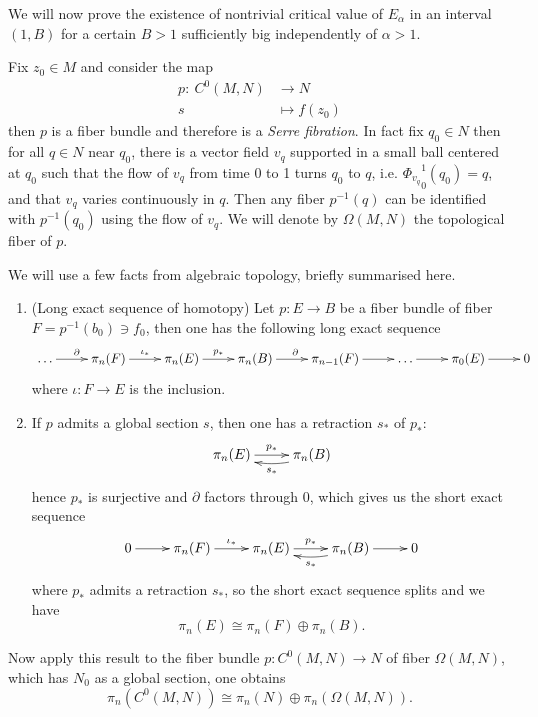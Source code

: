 We will now prove the existence of nontrivial critical value of \(E_\alpha\) in an
interval \((1, B)\) for a certain \(B>1\) sufficiently big independently of \(\alpha
> 1\).

Fix \(z_0\in M\) and consider the map 
\begin{align*}
  p: \ C^0(M,N) &\longrightarrow N\\
       s	&\longmapsto	 f(z_0)
\end{align*}
then \(p\) is a fiber bundle and therefore is a \emph{Serre fibration}. In fact fix \(q_0\in N\) then for all \(q\in N\) near \(q_0\), there is a vector field \(v_q\) supported
in a small ball centered at \(q_0\) such that the flow of \(v_q\) from time 0 to 1
turns \(q_0\) to \(q\), i.e. \({\Phi_{v_q}}_0^1(q_0)=q\), and that \(v_q\) varies continuously
in \(q\). Then any fiber \(p^{-1}(q)\) can be identified with \(p^{-1}(q_0)\) using
the flow of \(v_q\). We will denote by \(\Omega(M,N)\) the topological fiber of \(p\).


We will use a few facts from algebraic topology, briefly summarised here.

\begin{fact}
\label{fact:alg-top-Omega-M-N}
\begin{enumerate}
\item (Long exact sequence of homotopy) Let \(p: E \longrightarrow B\) be a fiber bundle
of fiber \(F = p^{-1}(b_0) \ni f_0\), then one has the following long exact sequence
\[
    \xymatrix{
    \dots \ar@{->}[r]^{\partial} & \pi_n(F) \ar@{->}[r]^{\iota_*} & \pi_n(E) \ar@{->}[r]^{p_*} & \pi_n(B) \ar@{->}[r]^{\partial} & \pi_{n-1}(F) \ar@{->}[r] & \dots \ar@{->}[r] & \pi_0(E) \ar@{->}[r] & 0
    }
   \]
 where \(\iota: F \longrightarrow E\) is the inclusion.
\item If \(p\) admits a global section \(s\), then one has a retraction \(s_*\) of \(p_*\):
\[
    \xymatrix{
    \pi_n(E) \ar@{->}[r]^{p_*} & \pi_n(B) \ar@/^/@{->}[l]^{s_*}
    }
   \]
hence \(p_*\) is surjective and \(\partial\) factors through \(0\), which gives
us the short exact sequence
\[
    \xymatrix{
    0 \ar@{->}[r] & \pi_n(F) \ar@{->}[r]^{\iota_*} & \pi_n(E) \ar@{->}[r]^{p_*} & \pi_n(B) \ar@/^/@{->}[l]^{s_*} \ar@{->}[r] & 0
    }
   \]
where \(p_*\) admits a retraction \(s_*\), so the short exact sequence splits and
we have
\[
   \pi_n(E) \cong \pi_n(F) \oplus \pi_n(B).
   \]
\end{enumerate}
\end{fact}

Now apply this result to the fiber bundle \(p: C^0(M,N)
\longrightarrow N\) of fiber \(\Omega(M,N)\), which has \(N_0\) as a global section,
one obtains
\[
 \pi_n(C^0(M,N)) \cong \pi_n(N) \oplus \pi_n(\Omega(M,N)).
\]


